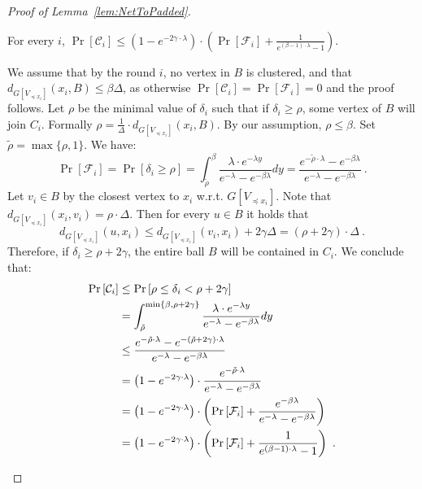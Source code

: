 \documentclass{article}
\begin{document}
\begin{proof}[Proof of Lemma~\ref{lem:NetToPadded}]
	\begin{claim}
		For every $i$, 
		$\Pr\left[\mathcal{C}_{i}\right]\le\left(1-e^{-2\gamma\cdot\lambda}\right)\cdot\left(\Pr\left[\mathcal{F}_{i}\right]+\frac{1}{e^{(\beta-1)\cdot\lambda}-1}\right)$.
	\end{claim}
	\begin{subproof}
		We assume that by the round $i$, no vertex in $B$ is clustered, and that $d_{G[V_{\preceq x_i}]}(x_{i},B)\le\beta\Delta$, as otherwise $\Pr[\mathcal{C}_i]=\Pr[\mathcal{F}_i]=0$ and the proof follows.
		Let $\rho$ be the minimal value of $\delta_{i}$ such that if $\delta_{i}\ge\rho$, some vertex of $B$ will join $C_i$.
		Formally $\rho=\frac{1}{\Delta}\cdot d_{G[V_{\preceq x_i}]}(x_{i},B)$.
		By our assumption, $\rho\le\beta$. Set $\tilde{\rho}=\max\{\rho,1\}$. We have:
		\[
		\Pr\left[\mathcal{F}_{i}\right]=\Pr\left[\delta_{i}\ge\rho\right]=\int_{\tilde{\rho}}^{\beta}\frac{\lambda\cdot e^{-\lambda y}}{e^{-\lambda}-e^{-\beta\lambda}}dy=\frac{e^{-\tilde{\rho}\cdot\lambda}-e^{-\beta\lambda}}{e^{-\lambda}-e^{-\beta\lambda}}~.
		\]
		Let $v_i\in B$ by the closest vertex to $x_i$ w.r.t. $G[V_{\preceq x_i}]$. Note that $d_{G[V_{\preceq x_i}]}(x_{i},v_i)=\rho\cdot\Delta$.
		Then for every $u\in B$ it holds that
		\[
		d_{G[V_{\preceq x_i}]}(u,x_{i})\le d_{G[V_{\preceq x_i}]}(v_{i},x_{i})+2\gamma\Delta=\left(\rho+2\gamma\right)\cdot\Delta~.
		\]
		Therefore,  if $\delta_{i}\ge\rho+2\gamma$, the entire ball $B$ will be contained in $C_i$.
		We conclude that:
		\begin{align*}
			\Pr\left[\mathcal{C}_{i}\right] & \le\Pr\left[\rho\le\delta_{i}<\rho+2\gamma\right]\\
			& =\int_{\tilde{\rho}}^{\min\left\{ \beta,\rho+2\gamma\right\} }\frac{\lambda\cdot e^{-\lambda y}}{e^{-\lambda}-e^{-\beta\lambda}}dy\\
			& \le\frac{e^{-\tilde{\rho}\cdot\lambda}-e^{-\left(\tilde{\rho}+2\gamma\right)\cdot\lambda}}{e^{-\lambda}-e^{-\beta\lambda}}\\
			& =\left(1-e^{-2\gamma\cdot\lambda}\right)\cdot\frac{e^{-\tilde{\rho}\cdot\lambda}}{e^{-\lambda}-e^{-\beta\lambda}}\\
			& =\left(1-e^{-2\gamma\cdot\lambda}\right)\cdot\left(\Pr\left[\mathcal{F}_{i}\right]+\frac{e^{-\beta\lambda}}{e^{-\lambda}-e^{-\beta\lambda}}\right)\\
			& =\left(1-e^{-2\gamma\cdot\lambda}\right)\cdot\left(\Pr\left[\mathcal{F}_{i}\right]+\frac{1}{e^{(\beta-1)\cdot\lambda}-1}\right)~.\qedhere
		\end{align*}
	\end{subproof}
	

\end{proof}
\end{document}
